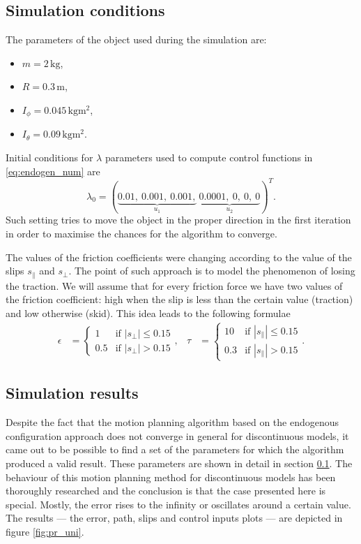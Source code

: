 \subsection{Simulation conditions}
\label{sec:discont_params_uni}
The parameters of the object used during the simulation are:
\begin{multicols}{2}
\begin{itemize}
\item $m=2 \,\mathrm{kg}$,
\item $R=0.3 \,\mathrm{m}$,
\item $I_\phi =0.045\,\mathrm{kgm^2}$,
\item $I_\theta =0.09\,\mathrm{kgm^2}$. 
\end{itemize}
\end{multicols}
Initial conditions for $\lambda$ parameters used to compute control functions
in \eqref{eq:endogen_num} are
\begin{equation}
\lambda_0=
(\underbrace{0.01, \ 0.001, \ 0.001,}_{u_1}\ \underbrace{0.0001, \ 0, \ 0, \ 0}_{u_2})^T.
\end{equation}
Such setting tries to move the object in the proper direction in the first iteration in order to
maximise the chances for the algorithm to converge.

The values of the friction coefficients were changing according to the value of the slips $s_\parallel$
and $s_\perp$. 
The point of such approach is to model the phenomenon
of losing the traction. We will assume that for every friction force we have two
values of the friction coefficient: high when the slip is less than the certain
value (traction) and low otherwise (skid). This idea leads to the following formulae
\begin{equation*}
\begin{aligned}
\epsilon&=\begin{cases}
1 &\mbox{if } |s_\perp| \leq 0.15 \\
0.5 &\mbox{if } |s_\perp| > 0.15
\end{cases}, &
\tau&=\begin{cases}
10 &\mbox{if } |s_\parallel| \leq 0.15 \\
0.3 &\mbox{if } |s_\parallel| > 0.15
\end{cases}.
\end{aligned}
\end{equation*}

\subsection{Simulation results}
Despite the fact that the motion planning algorithm based on the endogenous 
configuration approach does not converge in general for discontinuous models,
it came out to be possible to find a set of the parameters for which the algorithm produced
a valid result. These parameters are shown in detail in section \ref{sec:discont_params_uni}.
The behaviour of this motion planning method for discontinuous models has been thoroughly researched
and the conclusion is that the case presented here is special. Mostly, the error rises to the infinity
or oscillates around a certain value.
The results --- the error, path, slips and control inputs plots --- are depicted
in figure \ref{fig:pr_uni}.

